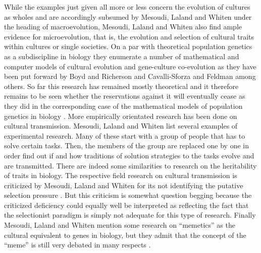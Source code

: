 While the examples just given all more or less concern the evolution
of cultures as wholes and are accordingly subsumed by Mesoudi, Laland
and Whiten under the heading of macroevolution, Mesoudi, Laland and
Whiten also find ample evidence for microevolution, that is, the
evolution and selection of cultural traits within cultures or single
societies. On a par with theoretical population genetics as a
subdiscipline in biology they enumerate a number of mathematical and
computer models of cultural evolution and gene-culture co-evolution as
they have been put forward by Boyd and Richerson
\cite[]{boyd-richerson:1985} and Cavalli-Sforza and Feldman
\cite[]{cavalli-sforza-feldman:1981} among others.  So far this
research has remained mostly theoretical and it therefore remains to
be seen whether the reservations against it will eventually cease as
they did in the corresponding case of the mathematical models of
population genetics in biology
\cite[p.\ 338]{mesoudi-laland-whiten:2006}.  More empirically
orientated research has been done on cultural transmission.  Mesoudi,
Laland and Whiten list several examples of experimental research.
Many of these start with a group of people that has to solve certain
tasks.  Then, the members of the group are replaced one by one in
order find out if and how traditions of solution strategies to the
tasks evolve and are transmitted. There are indeed some similarities
to research on the heritability of traits in biology.  The respective
field research on cultural transmission is criticized by Mesoudi,
Laland and Whiten for its not identifying the putative selection
pressure \cite[p.\  340]{mesoudi-laland-whiten:2006}. But this
criticism is somewhat question begging because the criticized
deficiency could equally well be interpreted as reflecting the fact
that the selectionist paradigm is simply not adequate for this type of
research.  Finally Mesoudi, Laland and Whiten mention some research on
``memetics'' as the cultural equivalent to genes in biology, but they
admit that the concept of the ``meme'' is still very debated in many
respects \cite[p.\ 342-344]{mesoudi-laland-whiten:2006}.

